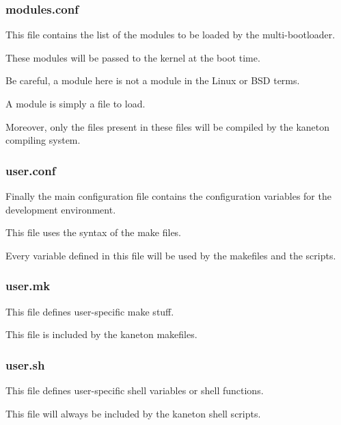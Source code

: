 {%

\begin{frame}
  \frametitle{modules.conf}

  This file contains the list of the modules to be loaded by the
  multi-bootloader.

  \nl

  These modules will be passed to the kernel at the boot time.

  \nl

  Be careful, a module here is not a module in the Linux or BSD terms.

  \nl

  A module is simply a file to load.

  \nl

  Moreover, only the files present in these files will be compiled by
  the kaneton compiling system.
\end{frame}


\begin{frame}
  \frametitle{user.conf}

  Finally the main configuration file contains the configuration
  variables for the development environment.

  \nl

  This file uses the syntax of the make files.

  \nl

  Every variable defined in this file will be used by the makefiles
  and the scripts.
\end{frame}


\begin{frame}
  \frametitle{user.mk}

  This file defines user-specific make stuff.

  \nl

  This file is included by the kaneton makefiles.
\end{frame}


\begin{frame}
  \frametitle{user.sh}

  This file defines user-specific shell variables or shell functions.

  \nl

  This file will always be included by the kaneton shell scripts.
\end{frame}

%
%

}
